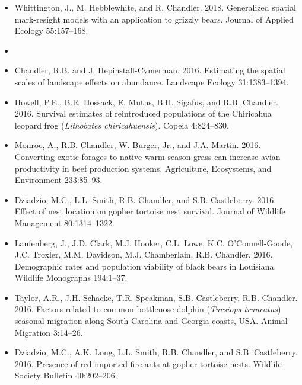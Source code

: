 \begin{itemize}
\item Whittington, J., M. Hebblewhite, and
  R. Chandler. 2018. Generalized spatial mark-resight models with an 
  application to grizzly bears. Journal of Applied Ecology
  55:157--168. 



\item[] { \\}

\item Chandler, R.B. and J. Hepinstall-Cymerman. 2016. Estimating
  the spatial scales of landscape effects on abundance. Landscape
  Ecology 31:1383--1394. 

\item Howell, P.E., B.R. Hossack, E. Muths, B.H. Sigafus, and
  R.B. Chandler. 2016. Survival estimates of reintroduced populations
  of the Chiricahua leopard frog ({\it Lithobates
    chiricahuensis}). Copeia 4:824--830.   

\item Monroe, A., R.B. Chandler, W. Burger, Jr., and J.A. Martin. 2016. 
  Converting exotic forages to native warm-season grass can
  increase avian productivity in beef production systems. Agriculture,
  Ecosystems, and Environment 233:85--93. 

\item Dziadzio, M.C., L.L. Smith, R.B. Chandler, and
  S.B. Castleberry. 2016. Effect of nest location on gopher
  tortoise nest survival. Journal of Wildlife Management 80:1314--1322.

\item Laufenberg, J., J.D. Clark, M.J. Hooker, C.L. Lowe,
  K.C. O'Connell-Goode, J.C. Troxler, M.M. Davidson, M.J. Chamberlain,
  R.B. Chandler. 2016. Demographic rates and population viability
  of black bears in Louisiana. Wildlife Monographs 194:1--37.

\item Taylor, A.R., J.H. Schacke, T.R. Speakman, S.B. Castleberry,
  R.B. Chandler. 2016. Factors related to common bottlenose dolphin
  ({\it Tursiops truncatus}) seasonal migration along South Carolina
  and Georgia coasts, USA. Animal Migration 3:14--26.

\item Dziadzio, M.C., A.K. Long, L.L. Smith, R.B. Chandler, and
  S.B. Castleberry. 2016. Presence of red imported fire ants at
  gopher tortoise nests. Wildlife Society Bulletin 40:202--206.  


\end{itemize}
